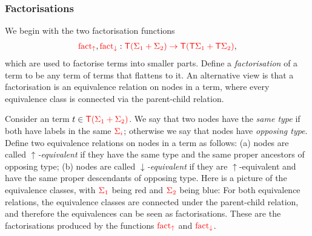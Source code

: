 \subsubsection{Factorisations}
\label{sec:factorisation-functions}
We begin with the two factorisation functions 
\begin{align*}
    {\color{red}{\mathrm{fact_{\uparrow}}}},{\color{red}{\mathrm{fact_{\downarrow}}}}  : {\color{red}{{\color{red}{\mathsf T}}(\Sigma_1+\Sigma_2) \to {\color{red}{\mathsf T}}({\color{red}{\mathsf T}}\Sigma_1 + {\color{red}{\mathsf T}}\Sigma_2)}},
\end{align*}
which are used to factorise  terms into smaller parts. 
Define a \emph{factorisation} of a term   to be any term of terms that flattens to it.  An alternative view is that a factorisation is an equivalence relation on nodes in a term, where every equivalence class is connected via the parent-child relation.

Consider an  term $t \in {\color{red}{{\color{red}{\mathsf T}}({\color{red}{\Sigma}}_1 + {\color{red}{\Sigma}}_2)}}$.
        We say that two nodes have the \emph{same type} if both have labels in the same  ${\color{red}{\Sigma_i}}$; otherwise we say that nodes have \emph{opposing type}. Define  two equivalence relations on  nodes in a term as follows: (a) nodes are called  \emph{$\uparrow$-equivalent}  if they have the same type and the same proper ancestors of opposing type; (b) nodes are  called  \emph{$\downarrow$-equivalent}  if they  are $\uparrow$-equivalent and have the same proper descendants of opposing type.
           Here is a picture of the equivalence classes, with ${\color{red}{\Sigma_1}}$ being red and ${\color{red}{\Sigma_2}}$ being blue: 
        For both  equivalence relations, the equivalence classes are connected  under the parent-child relation, and therefore the equivalences can be seen as factorisations. These are the factorisations  produced by the functions ${\color{red}{\mathrm{fact_{\uparrow}}}}$ and ${\color{red}{\mathrm{fact_{\downarrow}}}}$. 
    
